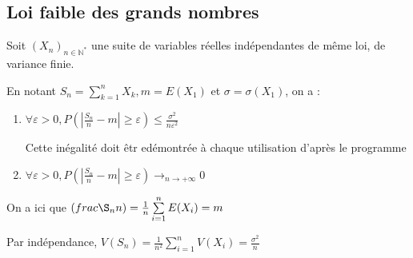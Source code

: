 \documentclass[a4paper,12pt]{book}
\newcommand{\Thr}[2]{\begin{tcolorbox}[sharp corners, colback=white,colframe=red!90!black!75, title=Théorème : #1]#2\end{tcolorbox}}
\newcommand{\Pre}[1]{\begin{tcolorbox}[sharp corners, colback=white,colframe=green!60!green!30!black!75, title=Preuve]#1\end{tcolorbox}}
\def\N{\mathbb{N}}
\begin{document}
\subsection{Loi faible des grands nombres}
\Thr{Loi faible des grands nombres}{Soit $(X_n)_{n\in\N^*}$ une suite de variables réelles indépendantes de même loi, de variance finie.
\par En notant $S_n=\sum\limits_{k=1}^nX_k, m=E(X_1)$ et $\sigma =\sigma(X_1)$, on a :\begin{enumerate}
\item \begin{center}$\forall \varepsilon>0, P\left(\left\vert\frac{S_n}{n}-m\right\vert\geq\varepsilon\right)\leq\frac{\sigma^2}{n\varepsilon^2}$\end{center} \par Cette inégalité doit êtr edémontrée à chaque utilisation d'après le programme
\item \begin{center}$\forall \varepsilon>0, P\left(\left\vert\frac{S_n}{n}-m\right\vert\geq\varepsilon\right)\to_{n\to+\infty} 0$\end{center}
\end{enumerate}}
\Pre{On a ici que $(frac{\S_n}{n}) = \frac{1}{n}\sum\limits_{i=1}^nE(X_i) = m$
\par Par indépendance, $V(S_n) = \frac{1}{n^2}\sum\limits_{i=1}^nV(X_i) = \frac{\sigma^2}{n}$

}
\end{document}
